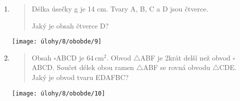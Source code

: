 \begin{enumerate}
\begin{minipage}[t]{\linewidth}
    \end{minipage}

    \item
    \begin{minipage}[t]{\linewidth}
        \begin{quote}
            Délka úsečky g je 14 cm. Tvary A, B, C a D jsou čtverce.

            Jaký je obsah čtverce D?
        \end{quote}
        \centering
        \texttt{[image: úlohy/8/obobde/9]}

    \end{minipage}

    \item
    \begin{minipage}[t]{\linewidth}
        \begin{quote}
            Obsah $\square$ABCD je $64\,\text{cm}^{2}$.
            Obvod $\triangle$ABF je 2krát delší než obvod $\square$ABCD. Součet délek obou ramen $\triangle$ABF se rovná obvodu $\triangle$CDE. Jaký je obvod tvaru EDAFBC?
        \end{quote}
        \centering
        \texttt{[image: úlohy/8/obobde/10]}

    \end{minipage}
\end{enumerate}


\newpage

